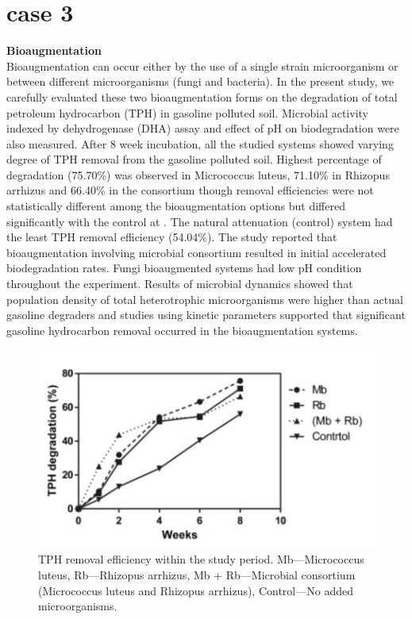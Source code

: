 \documentclass[twocolumn]{article} %
\begin{document}
\section{case 3}
\textbf{Bioaugmentation}\cite{bioaugmentation}\\
Bioaugmentation can occur either by the use of a single strain microorganism or between different microorganisms (fungi and bacteria). In the present study, we carefully evaluated these two bioaugmentation forms on the degradation of total petroleum hydrocarbon (TPH) in gasoline polluted soil. Microbial activity indexed by dehydrogenase (DHA) assay and effect of pH on biodegradation were also measured. After 8 week incubation, all the studied systems showed varying degree of TPH removal from the gasoline polluted soil. Highest percentage of degradation (75.70\%) was observed in Micrococcus luteus, 71.10\% in Rhizopus arrhizus and 66.40\% in the consortium though removal efficiencies were not statistically different among the bioaugmentation options but differed significantly with the control at 
. The natural attenuation (control) system had the least TPH removal efficiency (54.04\%). The study reported that bioaugmentation involving microbial consortium resulted in initial accelerated biodegradation rates. Fungi bioaugmented systems had low pH condition throughout the experiment. Results of microbial dynamics showed that population density of total heterotrophic microorganisms were higher than actual gasoline degraders and studies using kinetic parameters supported that significant gasoline hydrocarbon removal occurred in the bioaugmentation systems.

\begin{figure}[H]
    \centering
    \includegraphics[width=\columnwidth]{bioau.png}
    \caption{TPH removal efficiency within the study period. Mb—Micrococcus luteus, Rb—Rhizopus arrhizus, Mb + Rb—Microbial consortium (Micrococcus luteus and Rhizopus arrhizus), Control—No added microorganisms.}
\end{figure}
\end{document}
